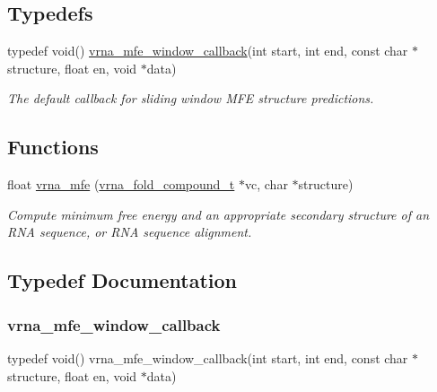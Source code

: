 \subsection*{Typedefs}
\begin{DoxyCompactItemize}
\item 
typedef void() \hyperlink{group__mfe__fold_ga4f3e5bc214ef803074ace313cb9571b4}{vrna\+\_\+mfe\+\_\+window\+\_\+callback}(int start, int end, const char $\ast$structure, float en, void $\ast$data)
\begin{DoxyCompactList}\small\item\em The default callback for sliding window M\+FE structure predictions. \end{DoxyCompactList}\end{DoxyCompactItemize}
\subsection*{Functions}
\begin{DoxyCompactItemize}
\item 
float \hyperlink{group__mfe__fold_gabd3b147371ccf25c577f88bbbaf159fd}{vrna\+\_\+mfe} (\hyperlink{group__fold__compound_ga1b0cef17fd40466cef5968eaeeff6166}{vrna\+\_\+fold\+\_\+compound\+\_\+t} $\ast$vc, char $\ast$structure)
\begin{DoxyCompactList}\small\item\em Compute minimum free energy and an appropriate secondary structure of an R\+NA sequence, or R\+NA sequence alignment. \end{DoxyCompactList}\end{DoxyCompactItemize}


\subsection{Typedef Documentation}
\mbox{\label{group__mfe__fold_ga4f3e5bc214ef803074ace313cb9571b4}} 
\subsubsection{\texorpdfstring{vrna\+\_\+mfe\+\_\+window\+\_\+callback}{vrna\_mfe\_window\_callback}}
{\footnotesize\ttfamily typedef void() vrna\+\_\+mfe\+\_\+window\+\_\+callback(int start, int end, const char $\ast$structure, float en, void $\ast$data)}



